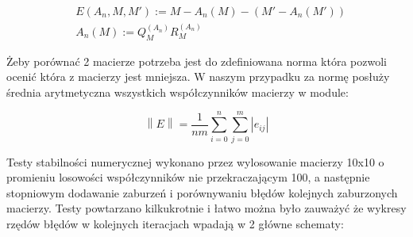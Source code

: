 \documentclass[11pt,wide]{mwart}
\newcommand{\norm}[1]{\left\lVert#1\right\rVert}
\begin{document}
\begin{equation}
\begin{aligned}
    & E(A_n, M, M') := M - A_n(M) - (M' - A_n(M')) \\
    & A_n(M) := Q_M^{(A_n)}R_M^{(A_n)}
\end{aligned}
\end{equation}

Żeby porównać 2 macierze potrzeba jest do zdefiniowana norma która pozwoli ocenić która z macierzy jest mniejsza. W naszym przypadku za normę posłuży średnia arytmetyczna wszystkich współczynników macierzy w module:

\begin{equation}
\norm{E} = \frac{1}{nm}\sum_{i=0}^n\sum_{j=0}^m |e_{ij}|
\end{equation}

Testy stabilności numerycznej wykonano przez wylosowanie macierzy 10x10 o promieniu losowości współczynników nie przekraczającym 100, a następnie stopniowym dodawanie zaburzeń i porównywaniu błędów kolejnych zaburzonych macierzy. Testy powtarzano kilkukrotnie i łatwo można było zauważyć że wykresy rzędów błędów w kolejnych iteracjach wpadają w 2 główne schematy:
\end{document}
